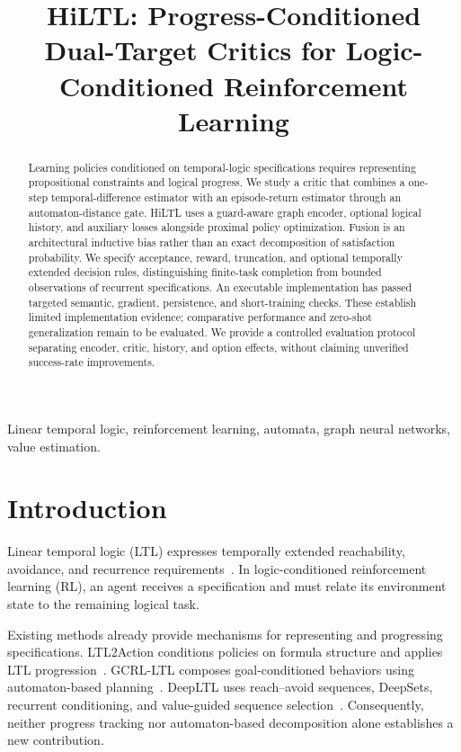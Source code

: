 \documentclass[conference]{IEEEtran}
\begin{document}
\title{HiLTL: Progress-Conditioned Dual-Target Critics for Logic-Conditioned Reinforcement Learning}
\author{}
\maketitle

\begin{abstract}
Learning policies conditioned on temporal-logic specifications requires representing propositional constraints and logical progress. We study a critic that combines a one-step temporal-difference estimator with an episode-return estimator through an automaton-distance gate. HiLTL uses a guard-aware graph encoder, optional logical history, and auxiliary losses alongside proximal policy optimization. Fusion is an architectural inductive bias rather than an exact decomposition of satisfaction probability. We specify acceptance, reward, truncation, and optional temporally extended decision rules, distinguishing finite-task completion from bounded observations of recurrent specifications. An executable implementation has passed targeted semantic, gradient, persistence, and short-training checks. These establish limited implementation evidence; comparative performance and zero-shot generalization remain to be evaluated. We provide a controlled evaluation protocol separating encoder, critic, history, and option effects, without claiming unverified success-rate improvements.
\end{abstract}
\begin{IEEEkeywords}
Linear temporal logic, reinforcement learning, automata, graph neural networks, value estimation.
\end{IEEEkeywords}

\section{Introduction}
Linear temporal logic (LTL) expresses temporally extended reachability, avoidance, and recurrence requirements~\citep{Pnueli1977,Baier2008}. In logic-conditioned reinforcement learning (RL), an agent receives a specification and must relate its environment state to the remaining logical task.

Existing methods already provide mechanisms for representing and progressing specifications. LTL2Action conditions policies on formula structure and applies LTL progression~\citep{Vaezipoor2021}. GCRL-LTL composes goal-conditioned behaviors using automaton-based planning~\citep{Qiu2023}. DeepLTL uses reach--avoid sequences, DeepSets, recurrent conditioning, and value-guided sequence selection~\citep{deepltl}. Consequently, neither progress tracking nor automaton-based decomposition alone establishes a new contribution.
\end{document}
